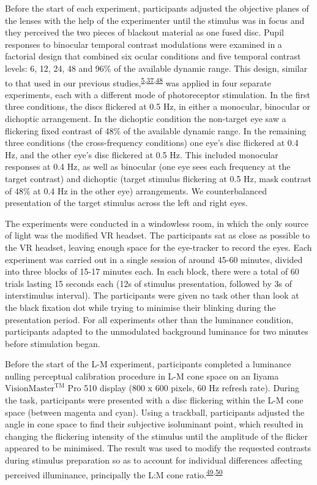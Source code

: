 \documentclass[
]{article}
\begin{document}
Before the start of each experiment, participants adjusted the objective planes of the lenses with the help of the experimenter until the stimulus was in focus and they perceived the two pieces of blackout material as one fused disc. Pupil responses to binocular temporal contrast modulations were examined in a factorial design that combined six ocular conditions and five temporal contrast levels: 6, 12, 24, 48 and 96\% of the available dynamic range. This design, similar to that used in our previous studies,\textsuperscript{\protect\hyperlink{ref-Segala2023}{5},\protect\hyperlink{ref-Baker2017}{37},\protect\hyperlink{ref-Baker2020}{48}} was applied in four separate experiments, each with a different mode of photoreceptor stimulation. In the first three conditions, the discs flickered at 0.5 Hz, in either a monocular, binocular or dichoptic arrangement. In the dichoptic condition the non-target eye saw a flickering fixed contrast of 48\% of the available dynamic range. In the remaining three conditions (the cross-frequency conditions) one eye's disc flickered at 0.4 Hz, and the other eye's disc flickered at 0.5 Hz. This included monocular responses at 0.4 Hz, as well as binocular (one eye sees each frequency at the target contrast) and dichoptic (target stimulus flickering at 0.5 Hz, mask contrast of 48\% at 0.4 Hz in the other eye) arrangements. We counterbalanced presentation of the target stimulus across the left and right eyes.

The experiments were conducted in a windowless room, in which the only source of light was the modified VR headset. The participants sat as close as possible to the VR headset, leaving enough space for the eye-tracker to record the eyes. Each experiment was carried out in a single session of around 45-60 minutes, divided into three blocks of 15-17 minutes each. In each block, there were a total of 60 trials lasting 15 seconds each (12s of stimulus presentation, followed by 3s of interstimulus interval). The participants were given no task other than look at the black fixation dot while trying to minimise their blinking during the presentation period. For all experiments other than the luminance condition, participants adapted to the unmodulated background luminance for two minutes before stimulation began.

Before the start of the L-M experiment, participants completed a luminance nulling perceptual calibration procedure in L-M cone space on an Iiyama \(\textrm{VisionMaster}^{\textrm{TM}}\) Pro 510 display (800 x 600 pixels, 60 Hz refresh rate). During the task, participants were presented with a disc flickering within the L-M cone space (between magenta and cyan). Using a trackball, participants adjusted the angle in cone space to find their subjective isoluminant point, which resulted in changing the flickering intensity of the stimulus until the amplitude of the flicker appeared to be minimised. The result was used to modify the requested contrasts during stimulus preparation so as to account for individual differences affecting perceived illuminance, principally the L:M cone ratio.\textsuperscript{\protect\hyperlink{ref-Carroll2002}{49},\protect\hyperlink{ref-Hofer2005}{50}}
\end{document}
